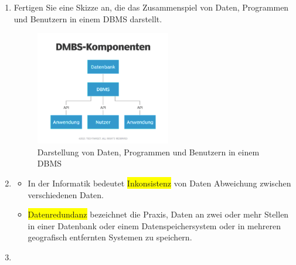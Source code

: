\begin{enumerate}
\begin{itemize}
        \item hohe Verfügbarkeit\\
        \item[] Die Vorteile des \colorbox{yellow}{Drei-Ebenen-Modells sind:} Physische Datenunabhängigkeit: Die interne Ebene ist von der konzeptionellen und externen Ebene getrennt.
        Physische Änderungen, logische Datenunabhängigkeit: Die konzeptionelle und die externe Ebene ist getrennt.
    \end{itemize}
    \item \color{brown} {Fertigen Sie eine Skizze an, die das Zusammenspiel von Daten, Programmen und Benutzern in einem DBMS darstellt.}
    \begin{itemize}
        \begin{center}
            \begin{figure}[H]
                \centering
                \includegraphics[height=5cm]{imgs/subjects_media/lf8/dmbs_compotents}
                \caption{\footnotesize Darstellung von Daten, Programmen und Benutzern in einem DBMS}\label{fig:DBMS}
            \end{figure}
        \end{center}
    \end{itemize}
    \item \color{brown}{Was versteht man unter Redundanz und Inkonsistenz?}
    \begin{itemize}\color{black}
        \item In der Informatik bedeutet \colorbox{yellow}{Inkonsistenz} von Daten Abweichung zwischen verschiedenen Daten.
        \item \colorbox{yellow}{Datenredundanz} bezeichnet die Praxis, Daten an zwei oder mehr Stellen in einer Datenbank oder einem Datenspeichersystem oder in mehreren geografisch entfernten Systemen zu speichern.
    \end{itemize}
    \item \color{brown}{Beschreiben Sie kurz die Entwicklungsgeschichte von Datenbanken.}

\end{enumerate}
